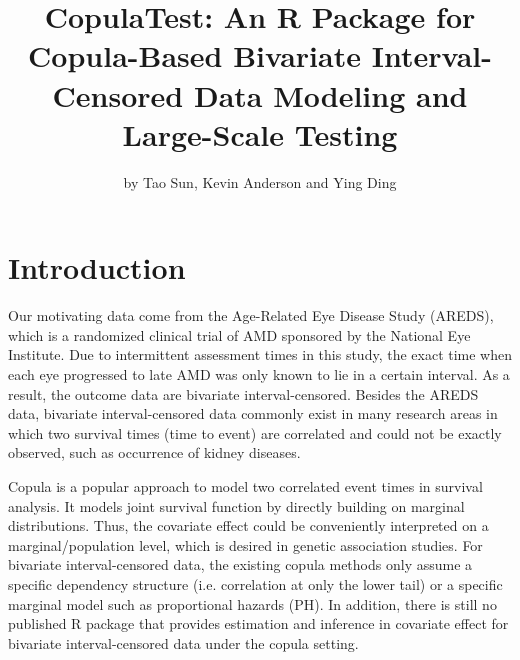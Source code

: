 \title{CopulaTest: An R Package for Copula-Based Bivariate Interval-Censored Data Modeling and Large-Scale Testing}
\author{by Tao Sun, Kevin Anderson and Ying Ding}

\maketitle


\section{Introduction}

Our motivating data come from the Age-Related Eye Disease Study (AREDS), which is a randomized clinical trial of AMD sponsored by the National Eye Institute. Due to intermittent assessment times in this study, the exact time when each eye progressed to late AMD was only known to lie in a certain interval. As a result, the outcome data are bivariate interval-censored. Besides the AREDS data, bivariate interval-censored data commonly exist in many research areas in which two survival times (time to event) are correlated and could not be exactly observed, such as occurrence of kidney diseases.

Copula is a popular approach to model two correlated event times in survival analysis. It models joint survival function by directly building on marginal distributions. Thus, the covariate effect could be conveniently interpreted on a marginal/population level, which is desired in genetic association studies. For bivariate interval-censored data, the existing copula methods only assume a specific dependency structure (i.e. correlation at only the lower tail) or a specific marginal model such as proportional hazards (PH). In addition, there is still no published R package that provides estimation and inference in covariate effect for bivariate interval-censored data under the copula setting.

